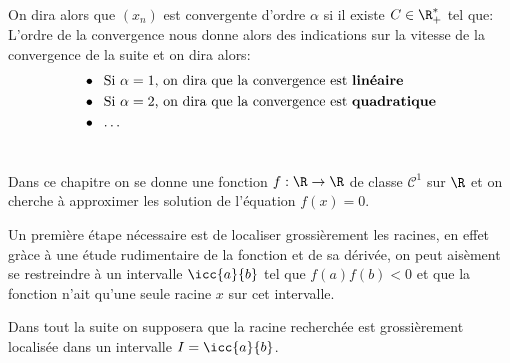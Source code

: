 On dira alors que \((x_n)\) est convergente d'ordre \(\alpha\) si il existe \(C \in \R_+^*\) tel que:
L'ordre de la convergence nous donne alors des indications sur la vitesse de la convergence de la suite et on dira alors:
\begin{align*}
   &\bullet \;\; \text{Si \(\alpha = 1\), on dira que la convergence est \textbf{linéaire}}\\
   &\bullet \;\; \text{Si \(\alpha = 2\), on dira que la convergence est \textbf{quadratique}}\\
   &\bullet \;\; \text{\ldots}
\end{align*}
\chapter*{}
Dans ce chapitre on se donne une fonction \(f : \R \rightarrow \R\) de classe \(\mathcal{C}^1\) sur \(\R\) et on cherche à approximer les solution de l'équation \(f(x) = 0\).\<

Un première étape nécessaire est de localiser grossièrement les racines, en effet gràce à une étude rudimentaire de la fonction et de sa dérivée, on peut aisèment se restreindre à un intervalle \(\icc{a}{b}\) tel que \(f(a)f(b) < 0\) et que la fonction n'ait qu'une seule racine \(x\) sur cet intervalle.\+

Dans tout la suite on supposera que la racine recherchée est grossièrement localisée dans un intervalle \(I = \icc{a}{b}\).

